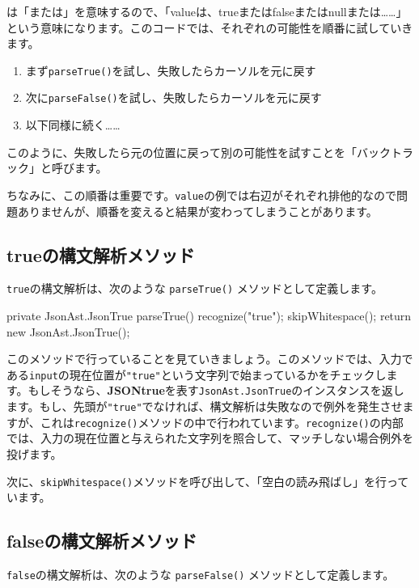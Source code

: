 \texttt{\textbar{}}は「または」を意味するので、「valueは、trueまたはfalseまたはnullまたは……」という意味になります。このコードでは、それぞれの可能性を順番に試していきます。

\begin{enumerate}
\item
  まず\texttt{parseTrue()}を試し、失敗したらカーソルを元に戻す
\item
  次に\texttt{parseFalse()}を試し、失敗したらカーソルを元に戻す
\item
  以下同様に続く……
\end{enumerate}

このように、失敗したら元の位置に戻って別の可能性を試すことを「バックトラック」と呼びます。

ちなみに、この順番は重要です。\texttt{value}の例では右辺がそれぞれ排他的なので問題ありませんが、順番を変えると結果が変わってしまうことがあります。

\subsection{trueの構文解析メソッド}

\texttt{true}の構文解析は、次のような \texttt{parseTrue()}
メソッドとして定義します。

\begin{codescreen}{}
private JsonAst.JsonTrue parseTrue() {
    recognize("true");
    skipWhitespace();
    return new JsonAst.JsonTrue();
}
\end{codescreen}

このメソッドで行っていることを見ていきましょう。このメソッドでは、入力である\texttt{input}の現在位置が\texttt{"true"}という文字列で始まっているかをチェックします。もしそうなら、\textbf{\sffamily JSON}\textbf{\sffamily true}を表す\texttt{JsonAst.JsonTrue}のインスタンスを返します。もし、先頭が\texttt{"true"}でなければ、構文解析は失敗なので例外を発生させますが、これは\texttt{recognize()}メソッドの中で行われています。\texttt{recognize()}の内部では、入力の現在位置と与えられた文字列を照合して、マッチしない場合例外を投げます。

次に、\texttt{skipWhitespace()}メソッドを呼び出して、「空白の読み飛ばし」を行っています。

\subsection{falseの構文解析メソッド}

\texttt{false}の構文解析は、次のような \texttt{parseFalse()}
メソッドとして定義します。

